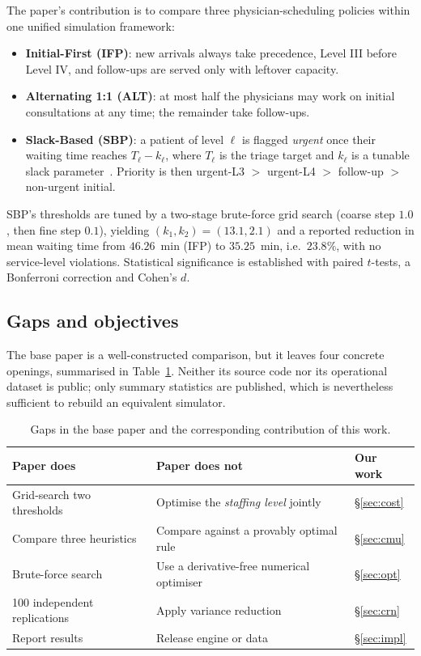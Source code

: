 \documentclass[sigconf,nonacm]{acmart}
\begin{document}
The paper's contribution is to compare three physician-scheduling policies
within one unified simulation framework:

\begin{itemize}
\item \textbf{Initial-First (IFP)}: new arrivals always take precedence, Level
      III before Level IV, and follow-ups are served only with leftover
      capacity.
\item \textbf{Alternating 1:1 (ALT)}: at most half the physicians may work on
      initial consultations at any time; the remainder take follow-ups.
\item \textbf{Slack-Based (SBP)}: a patient of level $\ell$ is flagged
      \emph{urgent} once their waiting time reaches $T_\ell - k_\ell$, where
      $T_\ell$ is the triage target and $k_\ell$ is a tunable slack
      parameter~\cite{davenport2001slack}. Priority is then
      urgent-L3 $>$ urgent-L4 $>$ follow-up $>$ non-urgent initial.
\end{itemize}

SBP's thresholds are tuned by a two-stage brute-force grid search (coarse step
$1.0$, then fine step $0.1$), yielding $(k_1,k_2)=(13.1,2.1)$ and a reported
reduction in mean waiting time from $46.26$~min (IFP) to $35.25$~min, i.e.\
$23.8\%$, with no service-level violations. Statistical significance is
established with paired $t$-tests, a Bonferroni correction and Cohen's $d$.

\subsection{Gaps and objectives}
The base paper is a well-constructed comparison, but it leaves four concrete
openings, summarised in Table~\ref{tab:gaps}. Neither its source code nor its
operational dataset is public; only summary statistics are published, which is
nevertheless sufficient to rebuild an equivalent simulator.

\begin{table}[t]
\caption{Gaps in the base paper and the corresponding contribution of this work.}
\label{tab:gaps}
\small
\begin{tabular}{@{}p{2.9cm}p{2.9cm}p{1.6cm}@{}}
\toprule
\textbf{Paper does} & \textbf{Paper does not} & \textbf{Our work} \\
\midrule
Grid-search two thresholds & Optimise the \emph{staffing level} jointly & \S\ref{sec:cost} \\
Compare three heuristics & Compare against a provably optimal rule & \S\ref{sec:cmu} \\
Brute-force search & Use a derivative-free numerical optimiser & \S\ref{sec:opt} \\
100 independent replications & Apply variance reduction & \S\ref{sec:crn} \\
Report results & Release engine or data & \S\ref{sec:impl} \\
\bottomrule
\end{tabular}
\end{table}
\end{document}
